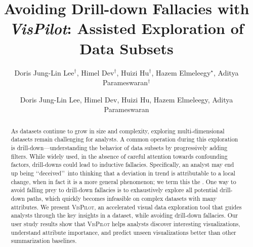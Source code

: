 \documentclass[sigchi]{acmart}
\newcommand{\system}{\textsc{VisPilot}\xspace}
\newcommand{\change}[1]{{\leavevmode\color{red}#1}}
\begin{document}
\author{Doris Jung-Lin Lee$^\dagger$, Himel Dev$^\dagger$, Huizi Hu$^\dagger$, Hazem Elmeleegy$^\star$, Aditya Parameswaran$^\dagger$}




\title{Avoiding Drill-down Fallacies with {\em VisPilot}: Assisted Exploration of Data Subsets}
\begin{abstract}
As datasets continue to grow in size and complexity,
exploring multi-dimensional datasets remain challenging for analysts.
A common operation during this exploration is drill-down---understanding
the behavior of data subsets by \change{progressively} adding filters.
While widely used, in the absence of careful attention towards confounding factors,
drill-downs could lead to inductive fallacies.
Specifically, an analyst may end up being \lq\lq deceived\rq\rq\ into thinking that a deviation in trend is attributable to a local change, when in fact \change{it is a more general phenomenon};
we term this the \change{{\em drill-down fallacy}}.
\change{One way to avoid falling prey to drill-down fallacies}
is to exhaustively explore all potential drill-down paths,
which quickly becomes infeasible \change{on complex datasets with many attributes}.
We present \system, an accelerated visual data exploration tool that guides analysts
\change{through the} key insights in a dataset, while avoiding drill-down fallacies.
Our user study results show that \system helps analysts discover
interesting visualizations, understand attribute importance,
and predict unseen visualizations better than other summarization baselines.
\end{abstract}
\maketitle
 \author{Doris Jung-Lin Lee, Himel Dev, Huizi Hu, Hazem Elmeleegy, Aditya Parameswaran}
\end{document}
